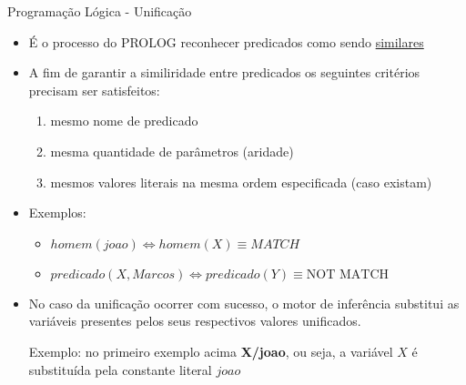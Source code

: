 \begin{frame}[t]{Programação Lógica - Unificação}
	\begin{itemize}
	\item É o processo do PROLOG reconhecer predicados como sendo \underline{similares}
	
	\item A fim de garantir a similiridade entre predicados os seguintes critérios precisam ser satisfeitos:
	\begin{enumerate}
	\item mesmo nome de predicado
	\item mesma quantidade de parâmetros (aridade)
	\item mesmos valores literais na mesma ordem especificada (caso existam)
	\end{enumerate}
	
	\item Exemplos:
	\begin{itemize}
	\item $homem(joao) \Leftrightarrow homem(X) \equiv MATCH$
	\item $predicado(X, Marcos) \Leftrightarrow predicado(Y) \equiv \mbox{NOT MATCH}$
	\end{itemize}
	
	\item No caso da unificação ocorrer com sucesso, o motor de inferência substitui as variáveis presentes pelos seus respectivos valores unificados. 
	
	Exemplo: no primeiro exemplo acima {\bf X/joao}, ou seja, a variável $X$ é substituída pela constante literal $joao$
	\end{itemize}
\end{frame}

